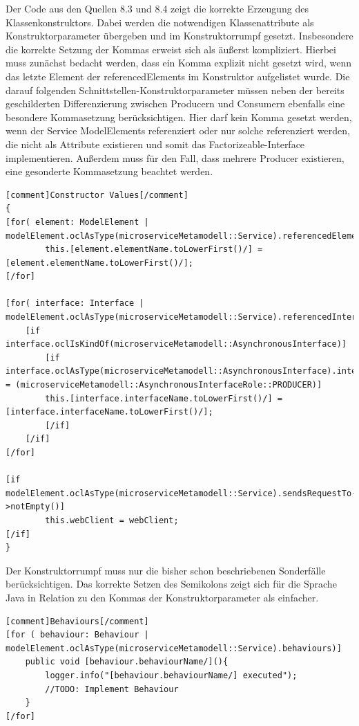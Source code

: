 Der Code aus den Quellen 8.3 und 8.4 zeigt die korrekte Erzeugung des Klassenkonstruktors. Dabei werden die notwendigen Klassenattribute als Konstruktorparameter übergeben und im Konstruktorrumpf gesetzt. Insbesondere die korrekte Setzung der Kommas erweist sich als äußerst kompliziert. Hierbei muss zunächst bedacht werden, dass ein Komma explizit nicht gesetzt wird, wenn das letzte Element der \glqq referencedElements\grqq{} im Konstruktor aufgelistet wurde. Die darauf folgenden Schnittstellen-Konstruktorparameter müssen neben der bereits geschilderten Differenzierung zwischen Producern und Consumern ebenfalls eine besondere Kommasetzung berücksichtigen. Hier darf kein Komma gesetzt werden, wenn der Service ModelElements referenziert oder nur solche referenziert werden, die nicht als Attribute existieren und somit das Factorizeable-Interface implementieren. Außerdem muss für den Fall, dass mehrere Producer existieren, eine gesonderte Kommasetzung beachtet werden.

\newpage

\begin{lstlisting}[caption=Konstruktorrumpf]
[comment]Constructor Values[/comment]
{
[for( element: ModelElement | modelElement.oclAsType(microserviceMetamodell::Service).referencedElements)]
		this.[element.elementName.toLowerFirst()/] = [element.elementName.toLowerFirst()/];
[/for]

[for( interface: Interface | modelElement.oclAsType(microserviceMetamodell::Service).referencedInterfaces)]
	[if interface.oclIsKindOf(microserviceMetamodell::AsynchronousInterface)]
		[if interface.oclAsType(microserviceMetamodell::AsynchronousInterface).interfaceRole = (microserviceMetamodell::AsynchronousInterfaceRole::PRODUCER)]
		this.[interface.interfaceName.toLowerFirst()/] = [interface.interfaceName.toLowerFirst()/];
		[/if]
	[/if]
[/for]

[if modelElement.oclAsType(microserviceMetamodell::Service).sendsRequestTo->notEmpty()]
    	this.webClient = webClient;
[/if]
}
\end{lstlisting}

Der Konstruktorrumpf muss nur die bisher schon beschriebenen Sonderfälle berücksichtigen. Das korrekte Setzen des Semikolons zeigt sich für die Sprache Java in Relation zu den Kommas der Konstruktorparameter als einfacher.

\begin{lstlisting}[caption=Methoden]
[comment]Behaviours[/comment]
[for ( behaviour: Behaviour | modelElement.oclAsType(microserviceMetamodell::Service).behaviours)]
	public void [behaviour.behaviourName/](){
		logger.info("[behaviour.behaviourName/] executed");
		//TODO: Implement Behaviour
	}
[/for]
\end{lstlisting}

